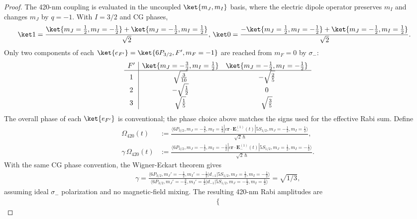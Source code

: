 \begin{proof}
    The 420-nm coupling is evaluated in the uncoupled $\ket{m_J,m_I}$ basis, where the electric dipole operator preserves $m_I$ and changes $m_J$ by $q=-1$. With $I=3/2$ and CG phases,
    \begin{align}
    \ket1
    &=\frac{
    \ket{m_J=\tfrac12,m_I=-\tfrac12}
    +\ket{m_J=-\tfrac12,m_I=\tfrac12}
    }{\sqrt2}
    ,\, \ket0
    =\frac{-\ket{m_J=\tfrac12,m_I=-\tfrac12}
    +\ket{m_J=-\tfrac12,m_I=\tfrac12}}{\sqrt2}.
    \end{align}
    Only two components of each $\ket{e_{F'}}=\ket{6P_{3/2},F',m_F=-1}$ are reached from $m_F=0$ by $\sigma_-$:
    \begin{align}
    \begin{array}{c|cc}
    F'&
    \ket{m_J=-\tfrac32,m_I=\tfrac12}&
    \ket{m_J=-\tfrac12,m_I=-\tfrac12}\\
    \hline
    1&\sqrt{\frac{3}{10}}&-\sqrt{\frac{2}{5}}\\
    2&-\sqrt{\frac{1}{2}}&0\\
    3&\sqrt{\frac{1}{5}}&\sqrt{\frac{3}{5}}
    \end{array}
    \end{align}
    The overall phase of each $\ket{e_{F'}}$ is conventional; the phase choice above matches the signs used for the effective Rabi sum.
    Define
    \begin{align}
    \Omega_{420}(t)
    &:=
    \frac{
    \langle 6P_{3/2},m_J=-\tfrac32,m_I=\tfrac12|
    e\mathbf r\cdot\mathbf E^{(1)}_-(t)
    |5S_{1/2},m_J=-\tfrac12,m_I=\tfrac12\rangle
    }{\sqrt2\,\hbar},\\
    \gamma\,\Omega_{420}(t)
    &:=
    \frac{
    \langle 6P_{3/2},m_J=-\tfrac12,m_I=-\tfrac12|
    e\mathbf r\cdot\mathbf E^{(1)}_-(t)
    |5S_{1/2},m_J=\tfrac12,m_I=-\tfrac12\rangle
    }{\sqrt2\,\hbar}.
    \end{align}
    With the same CG phase convention, the Wigner-Eckart theorem gives
    \begin{align}
    \gamma
    =
    \frac{
    \langle 6P_{3/2},m_J'=-\tfrac12,m_I'=-\tfrac12|d_{-1}|5S_{1/2},m_J=\tfrac12,m_I=-\tfrac12\rangle
    }{
    \langle 6P_{3/2},m_J'=-\tfrac32,m_I'=\tfrac12|d_{-1}|5S_{1/2},m_J=-\tfrac12,m_I=\tfrac12\rangle
    }
    =\sqrt{{1}/{3}},
    \end{align}
    assuming ideal $\sigma_-$ polarization and no magnetic-field mixing.
    The resulting 420-nm Rabi amplitudes are
    \begin{align}
        \left\{

\end{align}
\end{proof}

